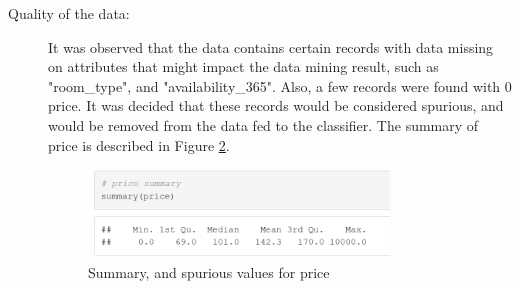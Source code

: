 \documentclass{sig-alternate}
\begin{document}
\begin{description}
\begin{figure}[ht]
		\label{price_hist_2}
	\end{figure}
           \item[Quality of the data:] It was observed that the data contains certain records with data missing on attributes that might impact the data mining result, such as "room\_type", and "availability\_365". Also, a few records were found with 0 price. It was decided that these records would be considered spurious, and would be removed from the data fed to the classifier. The summary of price is described in Figure \ref{price_summary}.
	\begin{figure}[ht]
		\includegraphics[width=8cm]{price_summary.png}
		\centering
		\caption{Summary, and spurious values for price}
		\label{price_summary}
	\end{figure}
       \end{description}
	
\end{document}
